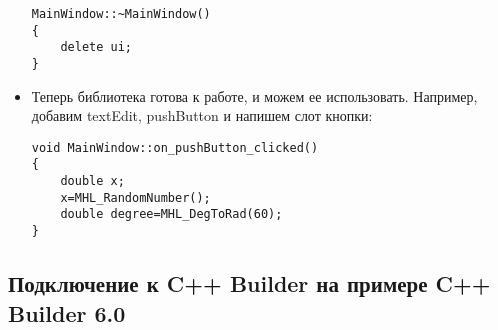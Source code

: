 \begin{itemize}
\begin{lstlisting}[label=install_03_qt,caption=Пример файла mainwindow.cpp с подключенной библиотекой]
MainWindow::~MainWindow()
{
    delete ui;
}
\end{lstlisting}

\item Теперь библиотека готова к работе, и можем ее использовать. Например, добавим textEdit, pushButton и напишем слот кнопки:
\begin{lstlisting}[label=install_04_qt,caption=Пример использования]
void MainWindow::on_pushButton_clicked()
{
    double x;
    x=MHL_RandomNumber();
    double degree=MHL_DegToRad(60);
}
\end{lstlisting}
\end{itemize}

\subsection{Подключение к C++ Builder на примере C++ Builder 6.0}
